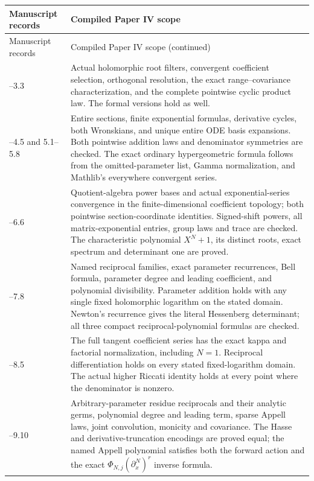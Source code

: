 \documentclass[11pt]{article}
\theoremstyle{definition}
\theoremstyle{remark}
\begin{document}
\begingroup
\small
\begin{longtable}{@{}>{\raggedright\arraybackslash}p{}>{\raggedright\arraybackslash}p{}@{}}
\toprule
Manuscript records & Compiled Paper IV scope \\
\midrule
\endfirsthead
\toprule
Manuscript records & Compiled Paper IV scope (continued) \\
\midrule
\endhead
3.1--3.3 & Actual holomorphic root filters, convergent coefficient
selection, orthogonal resolution, the exact range--covariance characterization,
and the complete pointwise cyclic product law. The formal versions hold as well. \\
4.1--4.5 and 5.1--5.8 & Entire sections, finite exponential formulas,
derivative cycles, both Wronskians, and unique entire ODE basis expansions.
Both pointwise addition laws and denominator symmetries are checked.
The exact ordinary hypergeometric formula follows from the omitted-parameter
list, Gamma normalization, and Mathlib's everywhere convergent series. \\
6.1--6.6 & Quotient-algebra power bases and actual exponential-series
convergence in the finite-dimensional coefficient topology; both pointwise
section-coordinate identities. Signed-shift powers, all matrix-exponential
entries, group laws and trace are checked. The characteristic polynomial
$X^N+1$, its distinct roots, exact spectrum and determinant one are proved. \\
7.1--7.8 & Named reciprocal families, exact parameter recurrences, Bell
formula, parameter degree and leading coefficient, and polynomial divisibility.
Parameter addition holds with any single fixed holomorphic logarithm on the
stated domain. Newton's recurrence gives the literal Hessenberg determinant;
all three compact reciprocal-polynomial formulas are checked. \\
8.1--8.5 & The full tangent coefficient series has the exact kappa and
factorial normalization, including $N=1$. Reciprocal differentiation holds on
every stated fixed-logarithm domain. The actual higher Riccati identity holds
at every point where the denominator is nonzero. \\
9.1--9.10 & Arbitrary-parameter residue reciprocals and their analytic germs,
polynomial degree and leading term, sparse Appell laws, joint convolution,
monicity and covariance. The Hasse and derivative-truncation encodings are
proved equal; the named Appell polynomial satisfies both the forward action
and the exact $\Phi_{N,j}(\partial_x^N)^r$ inverse formula. \\

\end{longtable}
\end{document}
